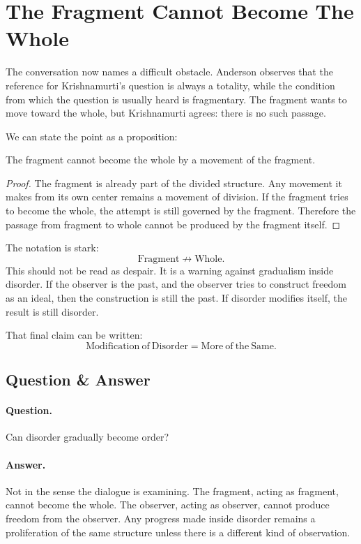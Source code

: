 \section{The Fragment Cannot Become The Whole}

The conversation now names a difficult obstacle. Anderson observes that the reference for Krishnamurti's question is always a totality, while the condition from which the question is usually heard is fragmentary. The fragment wants to move toward the whole, but Krishnamurti agrees: there is no such passage.

We can state the point as a proposition:
\begin{proposition}
The fragment cannot become the whole by a movement of the fragment.
\end{proposition}

\begin{proof}
The fragment is already part of the divided structure. Any movement it makes from its own center remains a movement of division. If the fragment tries to become the whole, the attempt is still governed by the fragment. Therefore the passage from fragment to whole cannot be produced by the fragment itself.
\end{proof}

The notation is stark:
\begin{equation}
\mathrm{Fragment} \nrightarrow \mathrm{Whole}.
\end{equation}
This should not be read as despair. It is a warning against gradualism inside disorder. If the observer is the past, and the observer tries to construct freedom as an ideal, then the construction is still the past. If disorder modifies itself, the result is still disorder.

That final claim can be written:
\begin{equation}
\mathrm{Modification\ of\ Disorder}
=
\mathrm{More\ of\ the\ Same}.
\end{equation}

\subsection{Question \& Answer}

\paragraph{Question.}
Can disorder gradually become order?

\paragraph{Answer.}
Not in the sense the dialogue is examining. The fragment, acting as fragment, cannot become the whole. The observer, acting as observer, cannot produce freedom from the observer. Any progress made inside disorder remains a proliferation of the same structure unless there is a different kind of observation.

